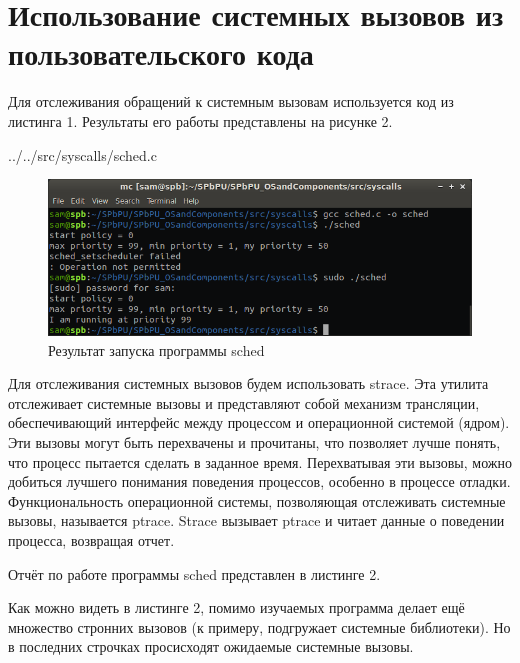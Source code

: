 \newpage
\section{Использование системных вызовов из пользовательского кода}

Для отслеживания обращений к системным вызовам используется код из листинга 1. Результаты его работы представлены на рисунке 2.


{../../src/syscalls/sched.c}

\begin{figure}[h!]
\centering
\includegraphics[scale=0.7]{res/pic002}
\caption{Результат запуска программы sched}
\end{figure}

Для отслеживания системных вызовов будем использовать strace. Эта утилита отслеживает системные вызовы и представляют собой механизм трансляции, обеспечивающий интерфейс между процессом и операционной системой (ядром). Эти вызовы могут быть перехвачены и прочитаны, что позволяет лучше понять, что процесс пытается сделать в заданное время. Перехватывая эти вызовы, можно добиться лучшего понимания поведения процессов, особенно в процессе отладки. Функциональность операционной системы, позволяющая отслеживать системные вызовы, называется ptrace. Strace вызывает ptrace и читает данные о поведении процесса, возвращая отчет.

Отчёт по работе программы sched представлен в листинге 2.



Как можно видеть в листинге 2, помимо изучаемых программа делает ещё множество стронних вызовов (к примеру, подгружает системные библиотеки). Но в последних строчках просисходят ожидаемые системные вызовы.